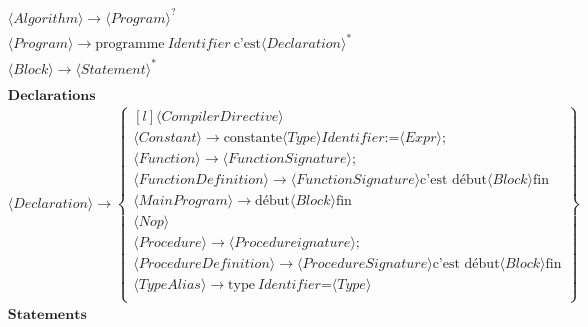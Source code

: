 \begin{align*}

&⟨Algorithm⟩ \to ⟨Program⟩^?
\\
&⟨Program⟩ \to \text{programme}\ Identifier\ \text{c'est} ⟨Declaration⟩^*
\\
&⟨Block⟩ \to ⟨Statement⟩^*

\\\\&\textbf{Declarations} \\

&⟨Declaration⟩ \to \begin{Bmatrix*}[l]
    ⟨CompilerDirective⟩ \\
    ⟨Constant⟩ \to \text{constante} ⟨Type⟩ Identifier \text{:=} ⟨Expr⟩\text{;} \\
    ⟨Function⟩ \to ⟨FunctionSignature⟩ \text{;} \\
    ⟨FunctionDefinition⟩ \to ⟨FunctionSignature⟩ \text{c'est\ début} ⟨Block⟩ \text{fin} \\
    ⟨MainProgram⟩ \to \text{début} ⟨Block⟩ \text{fin} \\
    ⟨Nop⟩ \\
    ⟨Procedure⟩ \to ⟨Procedureignature⟩ \text{;} \\
    ⟨ProcedureDefinition⟩ \to ⟨ProcedureSignature⟩ \text{c'est\ début} ⟨Block⟩ \text{fin} \\
    ⟨TypeAlias⟩ \to \text{type}\ Identifier \text{=} ⟨Type⟩ \\
\end{Bmatrix*}

\\&\textbf{Statements} \\


\end{align*}
